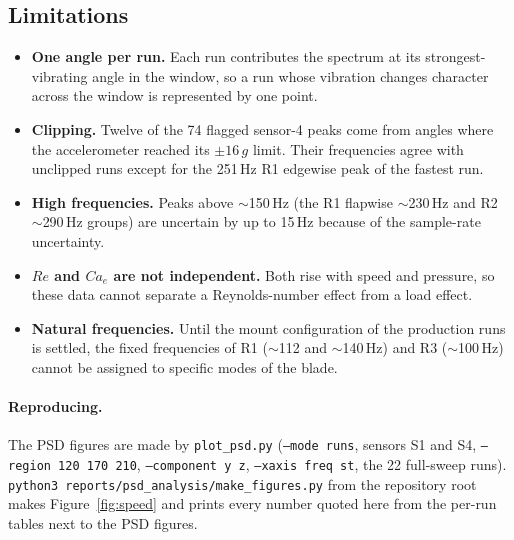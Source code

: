 \documentclass[11pt]{article}
\newcommand{\code}[1]{\texttt{#1}}
\begin{document}
\subsection{Limitations}

\begin{itemize}
  \item \textbf{One angle per run.} Each run contributes the spectrum at its
        strongest-vibrating angle in the window, so a run whose vibration
        changes character across the window is represented by one point.
  \item \textbf{Clipping.} Twelve of the 74 flagged sensor-4 peaks come from
        angles where the accelerometer reached its $\pm16\,g$ limit. Their
        frequencies agree with unclipped runs except for the 251\,Hz R1
        edgewise peak of the fastest run.
  \item \textbf{High frequencies.} Peaks above $\sim$150\,Hz (the R1 flapwise
        $\sim$230\,Hz and R2 $\sim$290\,Hz groups) are uncertain by up to
        15\,Hz because of the sample-rate uncertainty.
  \item \textbf{$Re$ and $Ca_e$ are not independent.} Both rise with speed
        and pressure, so these data cannot separate a Reynolds-number effect
        from a load effect.
  \item \textbf{Natural frequencies.} Until the mount configuration of the
        production runs is settled, the fixed frequencies of R1
        ($\sim$112 and $\sim$140\,Hz) and R3 ($\sim$100\,Hz) cannot be
        assigned to specific modes of the blade.
\end{itemize}

\paragraph{Reproducing.} The PSD figures are made by \code{plot\_psd.py}
(\code{--mode runs}, sensors S1 and S4, \code{--region 120 170 210},
\code{--component y z}, \code{--xaxis freq st}, the 22 full-sweep runs).
\code{python3 reports/psd\_analysis/make\_figures.py} from the repository root
makes Figure~\ref{fig:speed} and prints every number quoted here from the
per-run tables next to the PSD figures.
\end{document}
